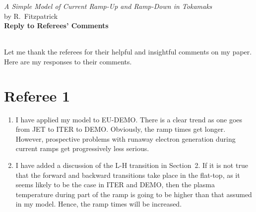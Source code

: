 \documentclass{article}[12pt]
\begin{document}
\begin{center}
{\em  A  Simple Model of Current Ramp-Up and Ramp-Down in Tokamaks}\\[1ex]
by R.~Fitzpatrick\\[1ex]
{\bf Reply to Referees' Comments}\\[1ex]
~
\end{center}
Let me thank the  referees for their helpful and insightful comments on my paper. Here are my responses to
their comments.

\section*{Referee 1}
\begin{enumerate}
\item I have applied my model to EU-DEMO. There is a clear trend as one goes from JET to ITER to DEMO. Obviously,
the ramp times get longer. However, prospective problems with runaway electron generation during current ramps get progressively
less serious. 

\item I have added a discussion of the L-H transition in Section~2. If it is not true that the forward and backward transitions take place
in the flat-top, as it seems likely to be the case in ITER and DEMO, then the plasma temperature during part of the ramp is going to
be higher than that assumed in my model. Hence, the ramp times will be increased. 
\end{enumerate}
\end{document}
